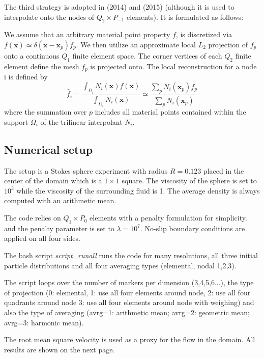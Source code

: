 The third strategy is adopted in \textcite{mabl14} (2014) and \textcite{mabl15} (2015) 
(although it is used to interpolate onto the nodes of $Q_2 \times P_{-1}$ elements). 
It is formulated as follows:

\begin{displayquote}
{\color{darkgray}
We assume that an arbitrary material point property $f$, is discretized via 
$f(\bm x)\simeq \delta(\bm x - \bm x_p) f_p$. We then utilize an approximate local $L_2$ projection
of $f_p$ onto a continuous $Q_1$ finite element space. The corner vertices of
each $Q_2$ finite element define the mesh $f_p$ is projected onto.
The local reconstruction for a node i is defined by
\[
\hat{f}_i = \frac{\int_{\Omega_i}N_i(\bm x) f(\bm x)}{\int_{\Omega_i} N_i(\bm x)} \simeq
\frac{\sum_p N_i(\bm x_p) f_p }{\sum_p N_i(\bm x_p)}
\]
where the summation over $p$ includes all material points 
contained within the support $\Omega_i$ of the trilinear interpolant $N_i$.}
\end{displayquote}


\subsection*{Numerical setup}

The setup is a Stokes sphere experiment with radius $R=0.123$ placed in the center 
of the domain which is a $1\times 1$ square. 
The viscosity of the sphere is set to $10^3$ while the viscosity of the 
surrounding fluid is 1. The average density is always computed with an arithmetic mean. 

The code relies on $Q_1 \times P_0$ elements with a penalty formulation for simplicity.
and the penalty parameter is set to $\lambda=10^7$.
No-slip boundary conditions are applied on all four sides.

The bash script {\sl script\_runall} 
runs the code for many resolutions, all three initial particle distributions and all four 
averaging types (elemental, nodal 1,2,3). 

The script loops over the number of markers per dimension (3,4,5,6...), 
the type of projection
(0: elemental, 1: use all four elements around node, 2: use all four quadrants around node
3: use all four elements around node with weighing) and also the type of averaging 
(avrg=1: arithmetic mean; avrg=2: geometric mean; avrg=3: harmonic mean).

The root mean square velocity is used as a proxy for the flow in the domain. 
All results are shown on the next page. 

